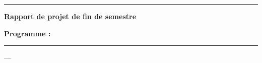 \documentclass[11pt,a4paper]{article}
\begin{document}
\begin{titlepage}
  \centering
  \vspace*{1cm}
  {\large \reportSchool \par}
  {\large \reportDepartment \par}
  \vspace{0.5cm}
  \rule{\linewidth}{0.4pt}
  \vspace{1.5cm}

  {\Large \textbf{Rapport de projet de fin de semestre} \par}
  \vspace{0.3cm}
  {\large \reportCourse \par}
  \vspace{2cm}

  {\Huge \textbf{\reportTitle} \par}
  \vspace{1cm}
  {\Large \textit{\reportSubtitle} \par}

  \vspace{3cm}
  {\large \textbf{Programme :} \reportProgram \par}

  \vfill
  \rule{\linewidth}{0.4pt}
  {\large \reportYear \quad --- \quad \reportDate \par}
\end{titlepage}

\cleardoublepage

\tableofcontents
\listoffigures
\listoftables

\cleardoublepage
{}
\setcounter{page}{1}






\cleardoublepage
{}


\end{document}
